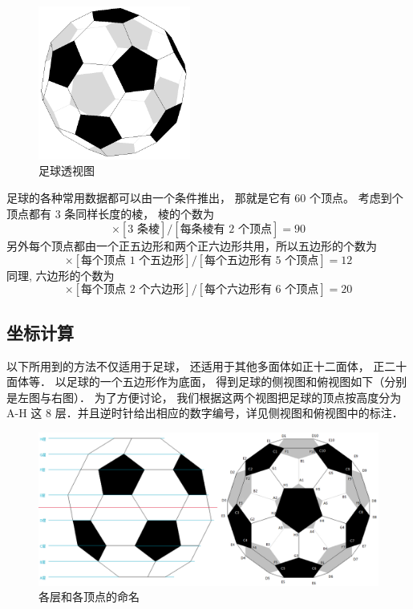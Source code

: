 

\begin{figure}[ht]
\centering
\includegraphics[width=5cm]{./figures/FootBl1.png}
\caption{足球透视图} \label{FootBl_fig1}
\end{figure}

足球的各种常用数据都可以由一个条件推出， 那就是它有 60 个顶点。 考虑到个顶点都有 3 条同样长度的棱， 棱的个数为
\begin{equation}
[\text{60 顶点}] \times [\text{3 条棱}] / [\text{每条棱有 2 个顶点}] = 90
\end{equation}
另外每个顶点都由一个正五边形和两个正六边形共用，所以五边形的个数为
\begin{equation}
[\text{60 顶点}] \times [\text{每个顶点 1 个五边形}] / [\text{每个五边形有 5 个顶点}] = 12
\end{equation}
同理, 六边形的个数为
\begin{equation}
[\text{60 顶点}] \times [\text{每个顶点 2 个六边形}] / [\text{每个六边形有 6 个顶点}] = 20
\end{equation}

\subsection{坐标计算}
以下所用到的方法不仅适用于足球， 还适用于其他多面体如正十二面体， 正二十面体等． 以足球的一个五边形作为底面， 得到足球的侧视图和俯视图如下（分别是左图与右图）． 为了方便讨论， 我们根据这两个视图把足球的顶点按高度分为 A-H 这 8 层．并且逆时针给出相应的数字编号，详见侧视图和俯视图中的标注．

\begin{figure}[ht]
\centering
\includegraphics[width=14cm]{./figures/FootBl2.png}
\caption{各层和各顶点的命名} \label{FootBl_fig2}
\end{figure}

